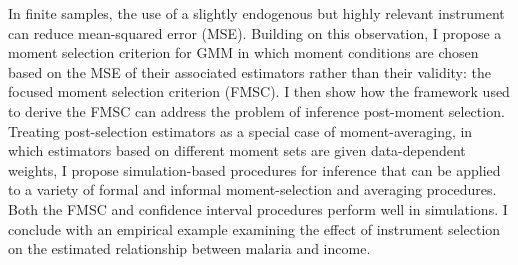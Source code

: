 In finite samples, the use of a slightly endogenous but highly relevant instrument can reduce mean-squared error (MSE). Building on this observation, I propose a moment selection criterion for GMM in which moment conditions are chosen based on the MSE of their associated estimators rather than their validity: the focused moment selection criterion (FMSC). 
I then show how the framework used to derive the FMSC can address the problem of inference post-moment selection.
Treating post-selection estimators as a special case of moment-averaging, in which estimators based on different moment sets are given data-dependent weights, I propose  simulation-based procedures for inference that can be applied to a variety of formal and informal moment-selection and averaging procedures.
Both the FMSC and confidence interval procedures perform well in simulations.
I conclude with an empirical example examining the effect of instrument selection on the estimated relationship between malaria and income.
